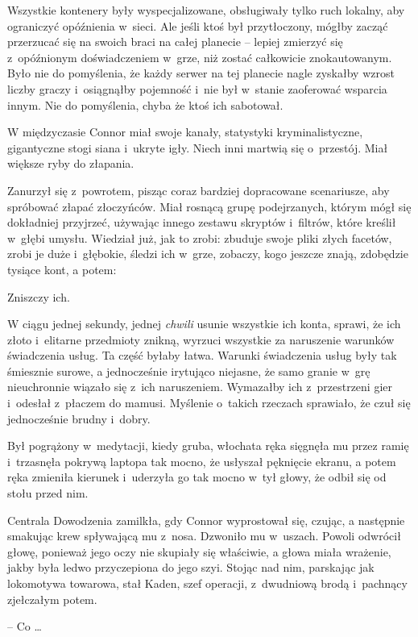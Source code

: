 \documentclass[oneside,polish,11pt,rmheadings]{mwbk}
\begin{document}
Wszystkie kontenery były wyspecjalizowane, obsługiwały tylko ruch lokalny, aby ograniczyć opóźnienia w~sieci. Ale jeśli ktoś był przytłoczony, mógłby zacząć przerzucać się na swoich braci na całej planecie -- lepiej zmierzyć się z~opóźnionym doświadczeniem w~grze, niż zostać całkowicie znokautowanym. Było nie do pomyślenia, że każdy serwer na tej planecie nagle zyskałby wzrost liczby graczy i~osiągnąłby pojemność i~nie był w~stanie zaoferować wsparcia innym. Nie do pomyślenia, chyba że ktoś ich sabotował.

W międzyczasie Connor miał swoje kanały, statystyki kryminalistyczne, gigantyczne stogi siana i~ukryte igły. Niech inni martwią się o~przestój. Miał większe ryby do złapania.

Zanurzył się z~powrotem, pisząc coraz bardziej dopracowane scenariusze, aby spróbować złapać złoczyńców. Miał rosnącą grupę podejrzanych, którym mógł się dokładniej przyjrzeć, używając innego zestawu skryptów i~filtrów, które kreślił w~głębi umysłu. Wiedział już, jak to zrobi: zbuduje swoje pliki złych facetów, zrobi je duże i~głębokie, śledzi ich w~grze, zobaczy, kogo jeszcze znają, zdobędzie tysiące kont, a potem:

Zniszczy ich.

W ciągu jednej sekundy, jednej \textit{chwili }usunie wszystkie ich konta, sprawi, że ich złoto i~elitarne przedmioty znikną, wyrzuci wszystkie za naruszenie warunków świadczenia usług. Ta część byłaby łatwa. Warunki świadczenia usług były tak śmiesznie surowe, a jednocześnie irytująco niejasne, że samo granie w~grę nieuchronnie wiązało się z~ich naruszeniem. Wymazałby ich z~przestrzeni gier i~odesłał z~płaczem do mamusi. Myślenie o~takich rzeczach sprawiało, że czuł się jednocześnie brudny i~dobry.

Był pogrążony w~medytacji, kiedy gruba, włochata ręka sięgnęła mu przez ramię i~trzasnęła pokrywą laptopa tak mocno, że usłyszał pęknięcie ekranu, a potem ręka zmieniła kierunek i~uderzyła go tak mocno w~tył głowy, że odbił się od stołu przed nim.

Centrala Dowodzenia zamilkła, gdy Connor wyprostował się, czując, a następnie smakując krew spływającą mu z~nosa. Dzwoniło mu w~uszach. Powoli odwrócił głowę, ponieważ jego oczy nie skupiały się właściwie, a głowa miała wrażenie, jakby była ledwo przyczepiona do jego szyi. Stojąc nad nim, parskając jak lokomotywa towarowa, stał Kaden, szef operacji, z~dwudniową brodą i~pachnący zjełczałym potem.

-- Co  \ldots 
\end{document}
